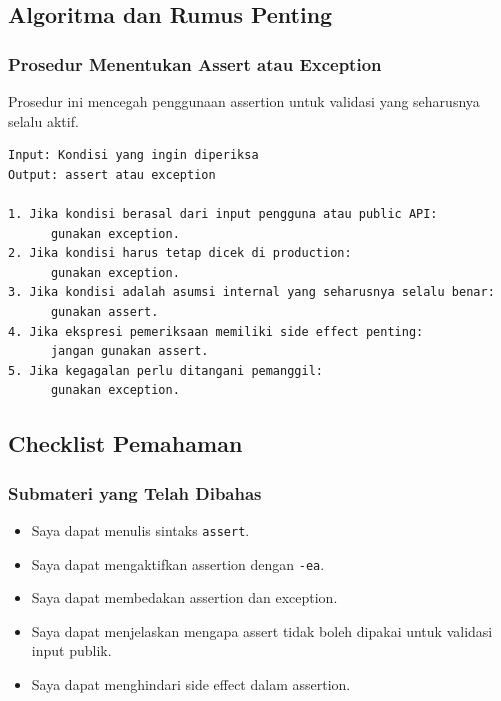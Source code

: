 \subsection{Algoritma dan Rumus Penting}

\subsubsection{Prosedur Menentukan Assert atau Exception}

\begin{jawab}
Prosedur ini mencegah penggunaan assertion untuk validasi yang seharusnya selalu aktif.
\end{jawab}

\begin{lstlisting}[caption={Pseudocode memilih assert atau exception}, label={lst:assert-vs-exception}]
Input: Kondisi yang ingin diperiksa
Output: assert atau exception

1. Jika kondisi berasal dari input pengguna atau public API:
      gunakan exception.
2. Jika kondisi harus tetap dicek di production:
      gunakan exception.
3. Jika kondisi adalah asumsi internal yang seharusnya selalu benar:
      gunakan assert.
4. Jika ekspresi pemeriksaan memiliki side effect penting:
      jangan gunakan assert.
5. Jika kegagalan perlu ditangani pemanggil:
      gunakan exception.
\end{lstlisting}

\subsection{Checklist Pemahaman}

\subsubsection{Submateri yang Telah Dibahas}

\begin{itemize}
    \item[$\square$] Saya dapat menulis sintaks \texttt{assert}.
    \item[$\square$] Saya dapat mengaktifkan assertion dengan \texttt{-ea}.
    \item[$\square$] Saya dapat membedakan assertion dan exception.
    \item[$\square$] Saya dapat menjelaskan mengapa assert tidak boleh dipakai untuk validasi input publik.
    \item[$\square$] Saya dapat menghindari side effect dalam assertion.
\end{itemize}

